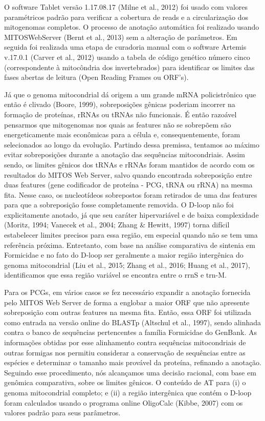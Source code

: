 \documentclass[../DISSERTACAO_MAIN.tex]{subfiles}
\begin{document}
	O software Tablet versão 1.17.08.17 (Milne et al., 2012) foi usado com valores paramétricos padrão para verificar a cobertura de reads e a circularização dos mitogenomas completos. O processo de anotação automática foi realizado usando MITOSWebServer (Bernt et al., 2013) sem a alteração de parâmetros. Em seguida foi realizada uma etapa de curadoria manual com o software Artemis v.17.0.1 (Carver et al., 2012) usando a tabela de código genético número cinco (correspondente à mitocôndria dos invertebrados) para identificar os limites das fases abertas de leitura (Open Reading Frames ou ORF’s). 
	
	Já que o genoma mitocondrial dá origem a um grande mRNA policistrônico que então é clivado (Boore, 1999), sobreposições gênicas poderiam incorrer na formação de proteínas, rRNAs ou tRNAs não funcionais. É então razoável pensarmos que mitogenomas nos quais as features não se sobrepõem são energeticamente mais econômicas para a célula e, consequentemente, foram selecionados ao longo da evolução. Partindo dessa premissa, tentamos ao máximo evitar sobreposições durante a anotação das sequências mitocondriais. Assim sendo, os limites gênicos dos tRNAs e rRNAs foram mantidos de acordo com os resultados do MITOS Web Server, salvo quando encontrada sobreposição entre duas features (gene codificador de proteína - PCG, tRNA ou rRNA) na mesma fita. Nesse caso, os nucleotídeos sobrepostos foram retirados de uma das features para que a sobreposição fosse completamente removida. O D-loop não foi explicitamente anotado, já que seu caráter hipervariável e de baixa complexidade (Moritz, 1994; Vanecek et al., 2004; Zhang \& Hewitt, 1997) torna difícil estabelecer limites precisos para essa região, em especial quando não se tem uma referência próxima. Entretanto, com base na análise comparativa de sintenia em Formicidae e no fato do D-loop ser geralmente a maior região intergênica do genoma mitocondrial (Liu et al., 2015; Zhang et al., 2016; Huang et al., 2017), identificamos que essa região variável se encontra entre o rrnS e trn-M.
	
	Para os PCGs, em vários casos se fez necessário expandir a anotação fornecida pelo MITOS Web Server de forma a englobar a maior ORF que não apresente sobreposição com outras features na mesma fita. Então, essa ORF foi utilizada como entrada na versão online do BLASTp (Altschul et al., 1997), sendo alinhada contra o banco de sequências pertencentes a família Formicidae do GenBank. As informações obtidas por esse alinhamento contra sequências mitocondriais de outras formigas nos permitiu considerar a conservação de sequências entre as espécies e determinar o tamanho mais provável da proteína, refinando a anotação. Seguindo esse procedimento, nós alcançamos uma decisão racional, com base em genômica comparativa, sobre os limites gênicos. O conteúdo de AT para (i) o genoma mitocondrial completo; e (ii) a região intergênica que contém o D-loop foram calculados usando o programa online OligoCalc (Kibbe, 2007) com os valores padrão para seus parâmetros.
\end{document}
